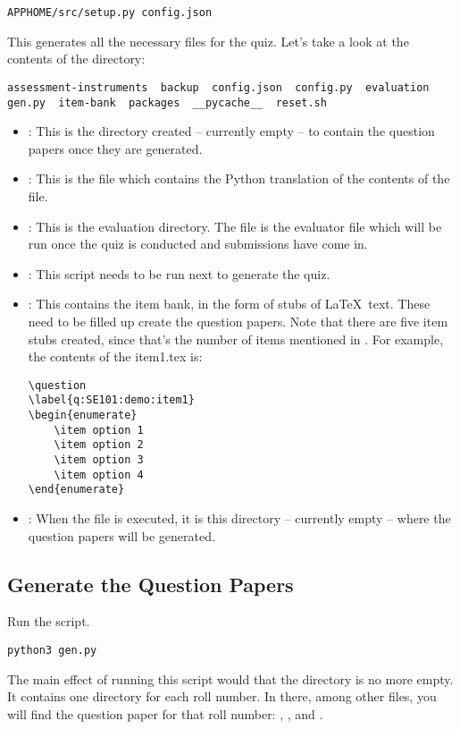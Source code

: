 \documentclass[12pt]{report}
\makeatletter
\newcommand{\kctt}[1]{{\color{Red}{\lstinline[basicstyle=\ttfamily, mathescape=true]@#1@}}}
\makeatother
\begin{document}
\begin{lstlisting}[style=oc]
APPHOME/src/setup.py config.json
\end{lstlisting}

This generates all the necessary files for the quiz. Let's take a look at the contents of the directory:
\begin{lstlisting}[style=oc]
assessment-instruments  backup  config.json  config.py  evaluation  gen.py  item-bank  packages  __pycache__  reset.sh
\end{lstlisting}
\begin{itemize}
\item \kctt{assessment-instruments}: This is the directory created -- currently empty -- to contain the question papers once they are generated.
\item \kctt{config.py}: This is the file which contains the Python translation of the contents of the \kctt{config.json} file.
\item \kctt{evaluation}: This is the evaluation directory. The \kctt{evaluate.py} file is the evaluator file which will be run once the quiz is conducted and submissions have come in.
\item \kctt{gen.py}: This script needs to be run next to generate the quiz.
\item \kctt{item-bank}: This contains the item bank, in the form of stubs of \LaTeX\ text. These need to be filled up create the question papers. Note that there are five item stubs created, since that's the number of items mentioned in \kctt{config.json}. For example, the contents of the item1.tex is:
\begin{lstlisting}[basicstyle=\ttfamily\small, frame=single]
\question
\label{q:SE101:demo:item1}
\begin{enumerate}
	\item option 1
	\item option 2
	\item option 3
	\item option 4
\end{enumerate}

\end{lstlisting}
\item \kctt{packages}: When the \kctt{gen.py} file is executed, it is this directory -- currently empty -- where the question papers will be generated. 
\end{itemize}

\subsection{Generate the Question Papers}
Run the \kctt{gen.py} script.
\begin{lstlisting}[style=oc]
python3 gen.py
\end{lstlisting}
The main effect of running this script would that the \kctt{packages} directory is no more empty. It contains one directory for each roll number. In there, among other files, you will find the question paper for that roll number: \kctt{packages/rn1/rn1.pdf}, \kctt{packages/rn2/rn2.pdf}, \kctt{packages/rn3/rn3.pdf} and \kctt{packages/rn4/rn4.pdf}.
\end{document}
